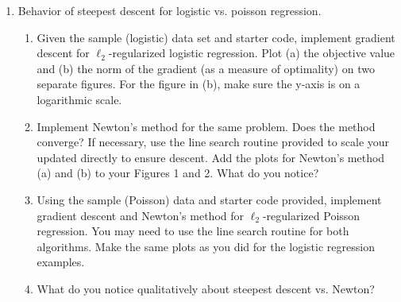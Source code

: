 \documentclass[11pt]{amsart}
\begin{document}
\begin{enumerate}
\item Behavior of steepest descent for logistic vs. poisson regression. 
\begin{enumerate}
\item Given the sample (logistic) data set and starter code, implement gradient descent for $\ell_2$-regularized logistic regression. 
Plot (a) the objective value and (b) the norm of the gradient 
(as a measure of optimality) on two separate figures. For the figure in (b), make sure the y-axis is on a logarithmic scale. 
\item Implement Newton's method for the same problem. Does the method converge? If necessary, use the line search routine provided
to scale your updated directly to ensure descent. Add the plots for Newton's method (a) and (b) to your Figures 1 and 2. What do you notice? 
\item Using the sample (Poisson) data  and starter code provided, implement gradient descent and Newton's method for $\ell_2$-regularized Poisson regression. You may need to use the line search routine for 
both algorithms. Make the same plots as you did for the logistic regression examples. 
\item What do you notice qualitatively about steepest descent vs. Newton?

 
\end{enumerate}

\bigskip\bigskip




\end{enumerate}
\end{document}
